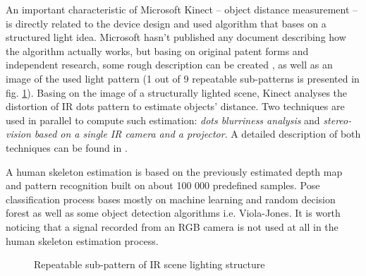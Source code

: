 \documentclass{llncs}
\begin{document}
An important characteristic of Microsoft Kinect -- object distance measurement -- is directly related to the device design and used algorithm that bases on a structured light idea. Microsoft hasn't published any document describing how the algorithm actually works, but basing on original patent forms \cite{patent:20080106746,patent:20100020078,patent:20100118123} and independent research, some rough description can be created \cite{reichinger2011}, as well as an image of the used light pattern (1 out of 9 repeatable sub-patterns is presented in fig. \ref{fig:characteristics:kinect:dotPattern}).
Basing on the image of a structurally lighted scene, Kinect analyses the distortion of IR dots pattern to estimate objects' distance. Two techniques are used in parallel to compute such estimation: \textit{dots blurriness analysis} and \textit{stereo-vision based on a single IR camera and a projector}. A detailed description of both techniques can be found in  \cite{Rzeszotarski2006,Fofi2004}.

A human skeleton estimation is based on the previously estimated depth map and pattern recognition built on about 100 000 predefined samples. Pose classification process bases mostly on machine learning and random decision forest as well as some object detection algorithms i.e. Viola-Jones\cite{Shotton2008,Shotton2011}. It is worth noticing that a signal recorded from an RGB camera is not used at all in the human skeleton estimation process.

\begin{figure}[h!]
	\centering 
	\begin{minipage}[b]{0.49\linewidth}
		\centering
		\vspace{2.5cm}
		\caption[]{Simplified Microsoft Kinect v.1 controller build schema \cite{kinectFixit2016}}
		\label{fig:characteristics:kinect:inside} 
	\end{minipage}
	\begin{minipage}[b]{0.49\linewidth}
		\centering 
		\vspace{2.5cm}
		\caption[]{Repeatable sub-pattern of IR scene lighting structure\cite{reichinger2011}}
		\label{fig:characteristics:kinect:dotPattern}
	\end{minipage}
\end{figure}
		
\end{document}
